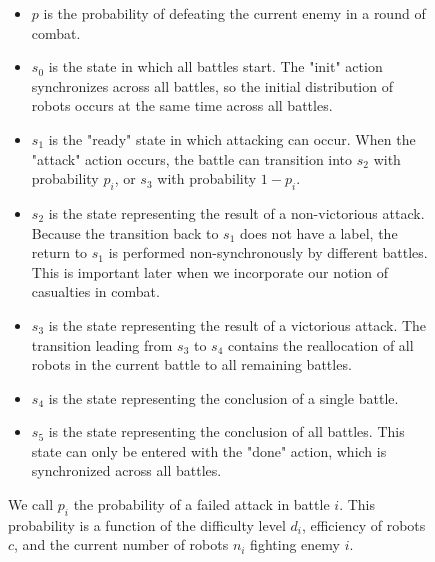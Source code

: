 \documentclass[11pt]{article}
\theoremstyle{definition}
\begin{document}
\begin{figure}
    \begin{itemize}
        \item $p$ is the probability of defeating the current
            enemy in a round of combat.
        \item $s_0$ is the state in which all battles start.
            The "init" action synchronizes across all
            battles, so the initial
            distribution of robots occurs at the same time
            across all battles.
        \item $s_1$ is the "ready" state in which
            attacking can occur. When the "attack" action
            occurs, the battle can transition into
            $s_2$ with probability $p_i$, or
            $s_3$ with probability $1 - p_i$.
        \item $ s_2 $ is the state representing the result
            of a non-victorious attack. Because
            the transition back to $s_1$ does not
            have a label, the return to $s_1$ is
            performed non-synchronously by different battles.
            This is important later when we incorporate
            our notion of casualties in combat.
        \item $s_3$ is the state representing the result
            of a victorious attack. The transition
            leading from $s_3$ to $s_4$ contains
            the reallocation of all robots in the
            current battle to all remaining battles.
        \item $s_4$ is the state representing the
            conclusion of a single battle.
        \item $s_5$ is the state representing the
            conclusion of all battles. This state
            can only be entered with the "done" action,
            which is synchronized across all battles.
    \end{itemize}

    We call $p_i$ the probability of a failed
    attack in battle $i$. This probability
    is a function of the difficulty level $ d_i $,
    efficiency of robots $c$, and
    the current number of robots $n_i$ fighting
    enemy $i$.
\end{figure}
\end{document}

